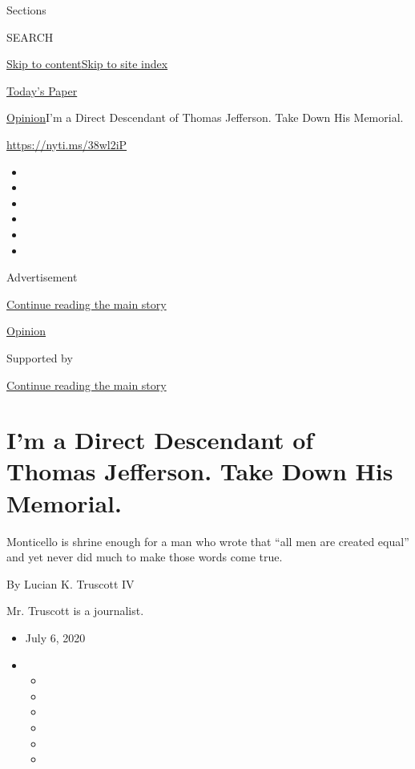 Sections

SEARCH

\protect\hyperlink{site-content}{Skip to
content}\protect\hyperlink{site-index}{Skip to site index}

\href{https://myaccount.nytimes.com/auth/login?response_type=cookie\&client_id=vi}{}

\href{https://www.nytimes.com/section/todayspaper}{Today's Paper}

\href{/section/opinion}{Opinion}\textbar{}I'm a Direct Descendant of
Thomas Jefferson. Take Down His Memorial.

\href{https://nyti.ms/38wl2iP}{https://nyti.ms/38wl2iP}

\begin{itemize}
\item
\item
\item
\item
\item
\item
\end{itemize}

Advertisement

\protect\hyperlink{after-top}{Continue reading the main story}

\href{/section/opinion}{Opinion}

Supported by

\protect\hyperlink{after-sponsor}{Continue reading the main story}

\hypertarget{im-a-direct-descendant-of-thomas-jefferson-take-down-his-memorial}{%
\section{I'm a Direct Descendant of Thomas Jefferson. Take Down His
Memorial.}\label{im-a-direct-descendant-of-thomas-jefferson-take-down-his-memorial}}

Monticello is shrine enough for a man who wrote that ``all men are
created equal'' and yet never did much to make those words come true.

By Lucian K. Truscott IV

Mr. Truscott is a journalist.

\begin{itemize}
\item
  July 6, 2020
\item
  \begin{itemize}
  \item
  \item
  \item
  \item
  \item
  \item
  \end{itemize}
\end{itemize}

